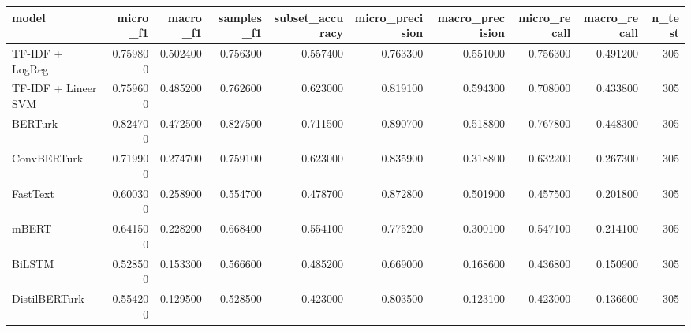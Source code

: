 \begin{tabular}{lrrrrrrrrr}
\toprule
model & micro_f1 & macro_f1 & samples_f1 & subset_accuracy & micro_precision & macro_precision & micro_recall & macro_recall & n_test \\
\midrule
TF-IDF + LogReg & 0.759800 & 0.502400 & 0.756300 & 0.557400 & 0.763300 & 0.551000 & 0.756300 & 0.491200 & 305 \\
TF-IDF + Lineer SVM & 0.759600 & 0.485200 & 0.762600 & 0.623000 & 0.819100 & 0.594300 & 0.708000 & 0.433800 & 305 \\
BERTurk & 0.824700 & 0.472500 & 0.827500 & 0.711500 & 0.890700 & 0.518800 & 0.767800 & 0.448300 & 305 \\
ConvBERTurk & 0.719900 & 0.274700 & 0.759100 & 0.623000 & 0.835900 & 0.318800 & 0.632200 & 0.267300 & 305 \\
FastText & 0.600300 & 0.258900 & 0.554700 & 0.478700 & 0.872800 & 0.501900 & 0.457500 & 0.201800 & 305 \\
mBERT & 0.641500 & 0.228200 & 0.668400 & 0.554100 & 0.775200 & 0.300100 & 0.547100 & 0.214100 & 305 \\
BiLSTM & 0.528500 & 0.153300 & 0.566600 & 0.485200 & 0.669000 & 0.168600 & 0.436800 & 0.150900 & 305 \\
DistilBERTurk & 0.554200 & 0.129500 & 0.528500 & 0.423000 & 0.803500 & 0.123100 & 0.423000 & 0.136600 & 305 \\
\bottomrule
\end{tabular}
